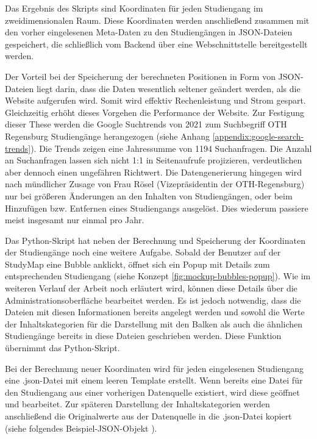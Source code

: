 Das Ergebnis des Skripts sind Koordinaten für jeden Studiengang im
zweidimensionalen Raum. Diese Koordinaten werden anschließend zusammen mit den
vorher eingelesenen Meta-Daten zu den Studiengängen in JSON-Dateien gespeichert,
die schließlich vom Backend über eine Webschnittstelle bereitgestellt werden.

Der Vorteil bei der Speicherung der berechneten Positionen in Form von
JSON-Dateien liegt darin, dass die Daten wesentlich seltener geändert werden,
als die Website aufgerufen wird. Somit wird effektiv Rechenleistung und Strom
gespart. Gleichzeitig erhöht
dieses Vorgehen die Performance der Website. Zur Festigung dieser These werden
die Google Suchtrends von 2021 zum Suchbegriff \glqq OTH Regensburg
Studiengänge\grqq{} herangezogen (siehe Anhang
\ref{appendix:google-search-trends}). Die Trends zeigen eine Jahressumme von
1194 Suchanfragen. Die Anzahl an Suchanfragen lassen sich nicht 1:1 in
Seitenaufrufe projizieren, verdeutlichen aber dennoch einen ungefähren
Richtwert. Die Datengenerierung hingegen wird nach mündlicher Zusage von
Frau Rösel (Vizepräsidentin der OTH-Regensburg) nur bei größeren Änderungen an den
Inhalten von Studiengängen, oder beim Hinzufügen bzw. Entfernen eines 
Studiengangs ausgelöst. Dies wiederum passiere meist insgesamt nur einmal pro
Jahr.

Das Python-Skript hat neben der Berechnung und Speicherung der Koordinaten der Studiengänge noch eine weitere Aufgabe. Sobald der Benutzer auf der StudyMap eine Bubble anklickt, öffnet sich ein Popup mit Details zum entsprechenden Studiengang (siehe Konzept \autoref{fig:mockup-bubbles-popup}). Wie im weiteren Verlauf der Arbeit noch erläutert wird, können diese Details über die Administrationsoberfläche bearbeitet werden. Es ist jedoch notwendig, dass die Dateien mit diesen Informationen bereits angelegt werden und sowohl die Werte der Inhaltskategorien für die Darstellung mit den Balken als auch die ähnlichen Studiengänge bereits in diese Dateien geschrieben werden. Diese Funktion übernimmt das Python-Skript.

Bei der Berechnung neuer Koordinaten wird für jeden eingelesenen Studiengang eine .json-Datei mit einem leeren Template erstellt. Wenn bereits eine Datei für den Studiengang aus einer vorherigen Datenquelle existiert, wird diese geöffnet und bearbeitet. Zur späteren Darstellung der Inhaltskategorien werden anschließend die Originalwerte aus der Datenquelle in die .json-Datei kopiert (siehe folgendes Beispiel-JSON-Objekt ).

